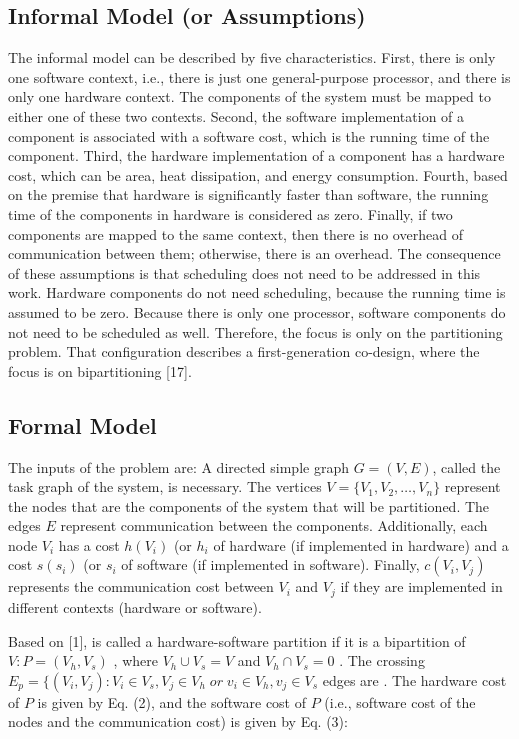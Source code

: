 \subsection{Informal Model (or Assumptions)}
The informal model can be described by five characteristics. First, there is only one software context, i.e., there is just one general-purpose processor, and there is only one hardware context. The components of the system must be mapped to either one of these two contexts. Second, the software implementation of a component is associated with a software cost, which is the running time of the component. Third, the hardware implementation of a component has a hardware cost, which can be area, heat dissipation, and energy consumption. Fourth, based on the premise that hardware is significantly faster than software, the running time of the components in hardware is considered as zero. Finally, if two components are mapped to the same context, then there is no overhead of communication between them; otherwise, there is an overhead. The consequence of these assumptions is that scheduling does not need to be addressed in this work. Hardware components do not need scheduling, because the running time is assumed to be zero. Because there is only one processor, software components do not need to be scheduled as well. Therefore, the focus is only on the partitioning problem. That configuration describes a first-generation co-design, where the focus is on bipartitioning [17].

\subsection{Formal Model}
The inputs of the problem are: A directed simple graph $ G = (V,E) $, called the task graph of the system, is necessary. The vertices $ V = \{V_1,V_2,\dotso,V_n\} $ represent the nodes that are the components of the system that will be partitioned. The edges $ E $ represent communication between the components. Additionally, each node  $ V_i $ has a cost $ h(V_i) $ (or $ h_i $ of hardware (if implemented in hardware) and a cost $ s(s_i) $ (or $ s_i $ of software (if implemented in software). Finally, $ c(V_i,V_j) $ represents the communication cost between $ V_i $ and $ V_j $ if they are implemented in different contexts (hardware or software).

Based on [1],  is called a hardware-software partition if it is a bipartition of $ V:P = (V_h, V_s) $ , where $ V_h \cup V_s = V $  and $ V_h \cap V_s = 0$  . The crossing $ E_p = \{(V_i,V_j):V_i \in V_s, V_j \in V_h \;or\; v_i \in V_h, v_j \in V_s $ edges are . The hardware cost of $ P $  is given by Eq. (2), and the software cost of $ P $ (i.e., software cost of the nodes and the communication cost) is given by Eq. (3):


